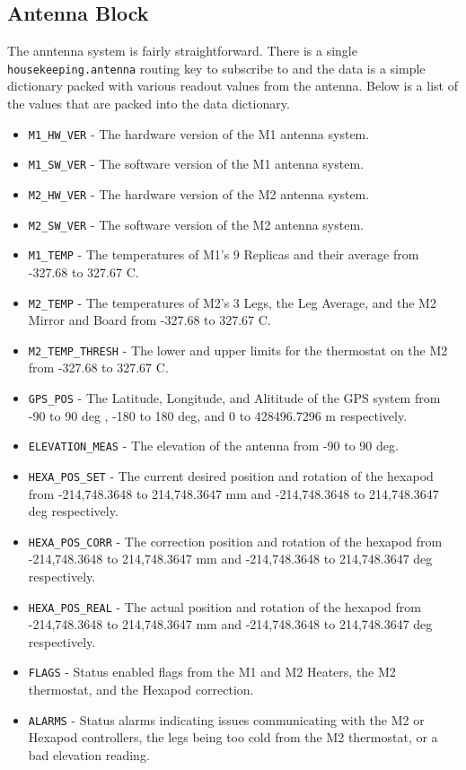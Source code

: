 \subsection{Antenna Block}
The anntenna system is fairly straightforward. 
There is a single \texttt{housekeeping.antenna} routing key to subscribe to and the data is a simple dictionary packed with various readout values from the antenna.
Below is a list of the values that are packed into the data dictionary. 
\begin{itemize}
    \item \texttt{M1\_HW\_VER} - The hardware version of the M1 antenna system.
    \item \texttt{M1\_SW\_VER} - The software version of the M1 antenna system.
    \item \texttt{M2\_HW\_VER} - The hardware version of the M2 antenna system.
    \item \texttt{M2\_SW\_VER} - The software version of the M2 antenna system.
    \item \texttt{M1\_TEMP} - The temperatures of M1's 9 Replicas and their average from -327.68 to 327.67 C. 
    \item \texttt{M2\_TEMP} - The temperatures of M2's 3 Legs, the Leg Average, and the M2 Mirror and Board from -327.68 to 327.67 C.
    \item \texttt{M2\_TEMP\_THRESH} - The lower and upper limits for the thermostat on the M2 from -327.68 to 327.67 C.
    \item \texttt{GPS\_POS} - The Latitude, Longitude, and Alititude of the GPS system from -90 to 90 deg , -180 to 180 deg, and 0 to 428496.7296 m respectively.
    \item \texttt{ELEVATION\_MEAS} - The elevation of the antenna from -90 to 90 deg.
    \item \texttt{HEXA\_POS\_SET} - The current desired position and rotation of the hexapod from -214,748.3648 to 214,748.3647 mm and -214,748.3648 to 214,748.3647 deg respectively.
    \item \texttt{HEXA\_POS\_CORR} - The correction position and rotation of the hexapod from -214,748.3648 to 214,748.3647 mm and -214,748.3648 to 214,748.3647 deg respectively.
    \item \texttt{HEXA\_POS\_REAL} - The actual position and rotation of the hexapod from -214,748.3648 to 214,748.3647 mm and -214,748.3648 to 214,748.3647 deg respectively.
    \item \texttt{FLAGS} - Status enabled flags from the M1 and M2 Heaters, the M2 thermostat, and the Hexapod correction. 
    \item \texttt{ALARMS} - Status alarms indicating issues communicating with the M2 or Hexapod controllers, the legs being too cold from the M2 thermostat, or a bad elevation reading.
\end{itemize}

